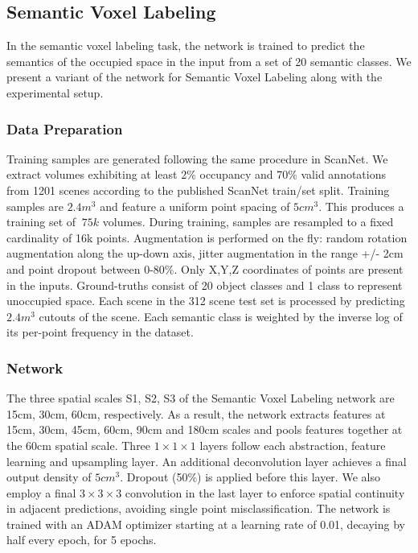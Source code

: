 \documentclass[runningheads]{llncs}
\begin{document}
\subsection{Semantic Voxel Labeling}
\label{section:EvalSVL}

In the semantic voxel labeling task, the network is trained to predict the semantics of the occupied space in the input from a set of 20 semantic classes. We present a variant of the network for Semantic Voxel Labeling along with the experimental setup. 

\subsubsection{Data Preparation}

Training samples are generated following the same procedure in ScanNet. We extract volumes exhibiting at least 2\% occupancy and 70\% valid annotations from 1201 scenes according to the published ScanNet train/set split. Training samples are $2.4m^3$ and feature a uniform point spacing of $5cm^3$. This produces a training set of $~75k$ volumes. During training, samples are resampled to a fixed cardinality of 16k points. Augmentation is performed on the fly: random rotation augmentation along the up-down axis, jitter augmentation in the range +/- 2cm and point dropout between 0-80\%. Only X,Y,Z coordinates of points are present in the inputs. Ground-truths consist of 20 object classes and 1 class to represent unoccupied space. Each scene in the 312 scene test set is processed by predicting $2.4m^3$ cutouts of the scene. Each semantic class is weighted by the inverse log of its per-point frequency in the dataset.

\subsubsection{Network}

The three spatial scales S1, S2, S3 of the Semantic Voxel Labeling network are 15cm, 30cm, 60cm, respectively. As a result, the network extracts features at 15cm, 30cm, 45cm, 60cm, 90cm and 180cm scales and pools features together at the 60cm spatial scale. Three $1\times 1\times 1$ layers follow each abstraction, feature learning and upsampling layer. An additional deconvolution layer achieves a final output density of $5cm^3$. Dropout (50\%) is applied before this layer. We also employ a final $3\times 3\times 3$ convolution in the last layer to enforce spatial continuity in adjacent predictions, avoiding single point misclassification. The network is trained with an ADAM optimizer starting at a learning rate of 0.01, decaying by half every epoch, for 5 epochs.
\end{document}
